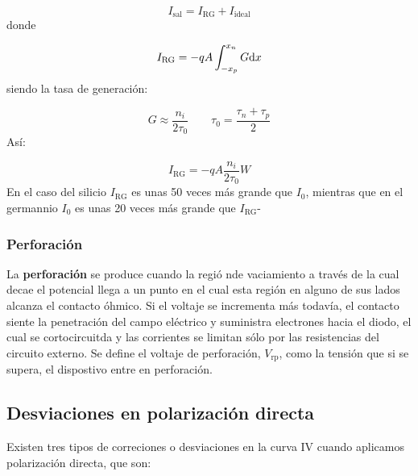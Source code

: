 \begin{equation}
    I_{\text{sal}} = I_{\text{RG}} + I_{\text{ideal}}
\end{equation}
donde 

\begin{equation}
    I_{\text{RG}} = - q A \int_{-x_p}^{x_n} G \mathrm{d} x
\end{equation}
siendo la tasa de generación: 

\begin{equation}
    G \approx \frac{n_i}{2\tau_0} \qquad \tau_0 = \frac{\tau_n+\tau_p}{2}
\end{equation}
Así: 

\begin{equation}
    I_{\text{RG}} = -q A \frac{n_i}{2\tau_0} W
\end{equation}
En el caso del silicio $I_{\text{RG}}$ es unas 50 veces más grande que $I_0$, mientras que en el germannio $I_0$ es unas 20 veces más grande que $I_{\text{RG}}$-

\subsubsection{Perforación}

La \textbf{perforación} se produce cuando la regió nde vaciamiento a través de la cual decae el potencial llega a un punto en el cual esta región en alguno de sus lados alcanza el contacto óhmico. Si el voltaje se incrementa más todavía, el contacto siente la penetración del campo eléctrico y suministra electrones hacia el diodo, el cual se cortocircuitda y las corrientes se limitan sólo por las resistencias del circuito externo. Se define el voltaje de perforación, $V_{\text{rp}}$, como la tensión que si se supera, el dispostivo entre en perforación. 

\subsection{Desviaciones en polarización directa}

Existen tres tipos de correciones o desviaciones en la curva IV cuando aplicamos polarización directa, que son:


